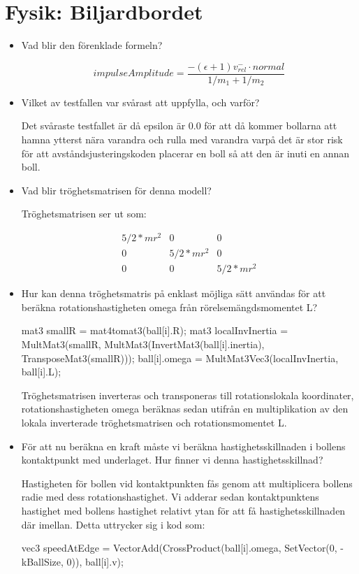 \documentclass[a4paper,12pt]{article}
\begin{document}
\section{Fysik: Biljardbordet}

\begin{itemize}
\item  Vad blir den förenklade formeln?

  \begin{equation}
    impulseAmplitude = \frac{-(\epsilon + 1)v^{-}_{rel} \cdot normal}{1/m_1+1/m_2}
  \end{equation}

\item Vilket av testfallen var svårast att uppfylla, och varför?

  Det svåraste testfallet är då epsilon är 0.0 för att då kommer bollarna att hamna ytterst nära varandra och rulla med varandra varpå det är stor risk för att avståndsjusteringskoden placerar en boll så att den är inuti en annan boll.

\item Vad blir tröghetsmatrisen för denna modell?

  Tröghetsmatrisen ser ut som:

  \begin{equation}
    \begin{matrix}
      5/2 * mr^2 & 0 & 0 \\
      0 & 5/2 * mr^2 & 0 \\
      0 & 0 & 5/2 * mr^2
    \end{matrix}
  \end{equation}

\item Hur kan denna tröghetsmatris på enklast möjliga sätt användas för att beräkna rotationshastigheten omega från rörelsemängdsmomentet L?

		mat3 smallR = mat4tomat3(ball[i].R);
		mat3 localInvInertia = MultMat3(smallR, MultMat3(InvertMat3(ball[i].inertia), TransposeMat3(smallR)));
		ball[i].omega = MultMat3Vec3(localInvInertia, ball[i].L);

  Tröghetsmatrisen inverteras och transponeras till rotationslokala koordinater, rotationshastigheten omega beräknas sedan utifrån en multiplikation av den lokala inverterade tröghetsmatrisen och rotationsmomentet L.

\item För att nu beräkna en kraft måste vi beräkna hastighetsskillnaden i bollens kontaktpunkt med underlaget. Hur finner vi denna hastighetsskillnad?

  Hastigheten för bollen vid kontaktpunkten fås genom att multiplicera bollens radie med dess rotationshastighet. Vi adderar sedan kontaktpunktens hastighet med bollens hastighet relativt ytan för att få hastighetsskillnaden där imellan. Detta uttrycker sig i kod som:

		vec3 speedAtEdge = VectorAdd(CrossProduct(ball[i].omega, SetVector(0, -kBallSize, 0)), ball[i].v);

\end{itemize}
\end{document}
